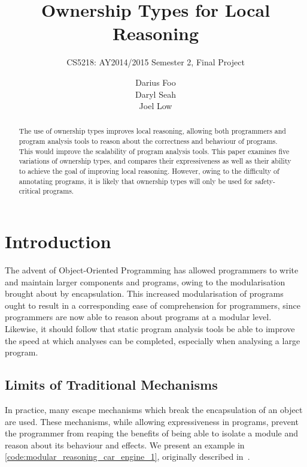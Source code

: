 \documentclass{acm_proc_article-sp}
\begin{document}
\title{Ownership Types for Local Reasoning}
\subtitle{CS5218: AY2014/2015 Semester 2, Final Project}


\author{
\alignauthor
Darius Foo\\
\alignauthor
Daryl Seah\\
\alignauthor
Joel Low\\
}



\maketitle
\begin{abstract}
The use of ownership types improves local reasoning, allowing both programmers
and program analysis tools to reason about the correctness and behaviour of
programs. This would improve the scalability of program analysis tools. This
paper examines five variations of ownership types, and compares their
expressiveness as well as their ability to ach\-ieve the goal of improving
local reasoning. However, owing to the difficulty of annotating programs, it is
likely that ownership types will only be used for safety-critical programs.
\end{abstract}

\section{Introduction}
\label{sec:introduction}

The advent of Object-Oriented Programming has allowed programmers to write and
maintain larger components and programs, owing to the modularisation brought
about by encapsulation. This increased modularisation of programs ought to
result in a corresponding ease of comprehension for programmers, since
programmers are now able to reason about programs at a modular level.
Likewise, it should follow that static program analysis tools be able to
improve the speed at which analyses can be completed, especially when analysing
a large program.

\subsection{Limits of Traditional Mechanisms}
\label{subsec:traditional_mechanism_limits}
In practice, many escape mechanisms which break the encapsulation of an object
are used. These mechanisms, while allowing expressiveness in programs, prevent
the programmer from reaping the benefits of being able to isolate a module and
reason about its behaviour and effects. We present an example in
\cref{code:modular_reasoning_car_engine_1}, originally
described in~\cite{clarke98ownership}.
\end{document}
